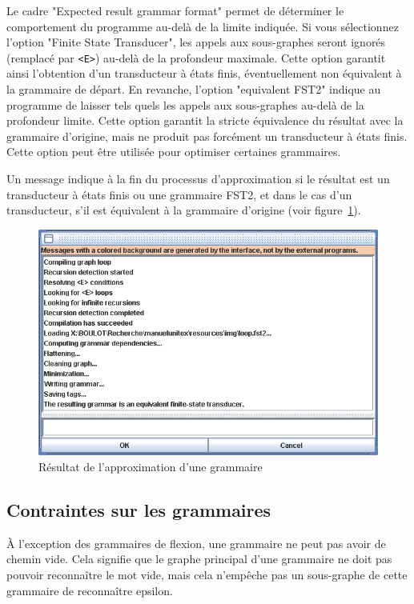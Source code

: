 \bigskip
\noindent Le cadre "Expected result grammar format" permet de déterminer le comportement du
programme au-delà de la limite indiquée. Si vous sélectionnez l’option "Finite State Transducer",
les appels aux sous-graphes seront ignorés (remplacé par \verb+<E>+) au-delà de la profondeur
maximale. Cette option garantit ainsi l’obtention d’un transducteur à états finis, éventuellement
non équivalent à la grammaire de départ. En revanche, l’option "equivalent FST2" indique au
programme de laisser tels quels les appels aux sous-graphes au-delà de la profondeur limite.
Cette option garantit la stricte équivalence du résultat avec la grammaire d’origine, mais
ne produit pas forcément un transducteur à états finis. Cette option peut être utilisée pour
optimiser certaines grammaires.


\bigskip
\noindent Un message indique à la fin du processus d’approximation si le résultat est un transducteur
à états finis ou une grammaire FST2, et dans le cas d’un transducteur, s’il est équivalent
à la grammaire d’origine (voir figure~\ref{fig-flatten-result}).


\bigskip
\begin{figure}[!ht]
\begin{center}
\includegraphics[width=14.7cm]{resources/img/fig6-6.png}
\caption{Résultat de l’approximation d’une grammaire\label{fig-flatten-result}}
\end{center}
\end{figure}


\subsection{Contraintes sur les grammaires}
À l’exception des grammaires de flexion, une grammaire ne peut pas avoir de chemin
vide. Cela signifie que le graphe principal d’une grammaire ne doit pas pouvoir reconnaître
le mot vide, mais cela n’empêche pas un sous-graphe de cette grammaire de reconnaître
epsilon.


